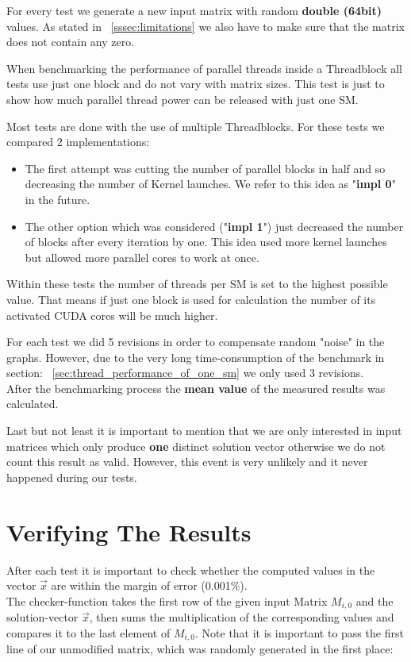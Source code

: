 \documentclass[draft, final]{vutinfth} %
\begin{document}
		For every test we generate a new input matrix with random \textbf{double (64bit)} values. As stated in ~\ref{sssec:limitations} we also have to make sure that the matrix does not contain any zero.

		When benchmarking the performance of parallel threads inside a Threadblock all tests use just one block and do not vary with matrix sizes. This test is just to show how much parallel thread power can be released with just one SM.

		Most tests are done with the use of multiple Threadblocks. For these tests we compared 2 implementations:
		\begin{itemize}
			\item The first attempt was cutting the number of parallel blocks in half and so decreasing the number of Kernel launches. We refer to this idea as "\textbf{impl 0}" in the future.
			\item The other option which was considered ("\textbf{impl 1}") just decreased the number of blocks after every iteration by one. This idea used more kernel launches but allowed more parallel cores to work at once.
		\end{itemize}

		Within these tests the number of threads per SM is set to the highest possible value. That means if just one block is used for calculation the number of its activated CUDA cores will be much higher.

		For each test we did 5 revisions in order to compensate random "noise" in the graphs. However, due to the very long time-consumption of the benchmark in section: ~\ref{sec:thread_performance_of_one_sm} we only used 3 revisions.\\
		After the benchmarking process the \textbf{mean value} of the measured results was calculated.

		Last but not least it is important to mention that we are only interested in input matrices which only produce \textbf{one} distinct solution vector otherwise we do not count this result as valid. However, this event is very unlikely and it never happened during our tests.

	\section{Verifying The Results}
		After each test it is important to check whether the computed values in the vector $\vec{x}$ are within the margin of error (0.001\%).\\
		The checker-function takes the first row of the given input Matrix $M_{i,0}$ and the solution-vector $\vec{x}$, then sums the multiplication of the corresponding values and compares it to the last element of $M_{i,0}$. Note that it is important to pass the first line of our unmodified matrix, which was randomly generated in the first place:
\end{document}
